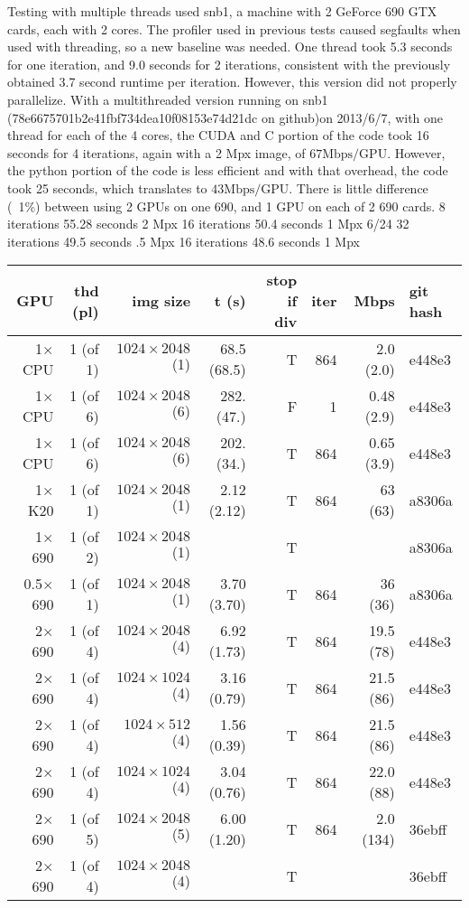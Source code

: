 \documentclass[11pt]{article}
\begin{document}
	Testing with multiple threads used snb1, a machine with 2 GeForce 690 GTX cards, each with 2 cores. The profiler used in previous tests caused segfaults when used with threading, so a new baseline was needed.  One thread took 5.3 seconds for one iteration, and 9.0 seconds for 2 iterations, consistent with the previously obtained 3.7 second runtime per iteration.  However, this version did not properly parallelize.
	With a multithreaded version running on snb1 (78e6675701b2e41fbf734dea10f08153e74d21dc on github)on 2013/6/7, with one thread for each of the 4 cores, the CUDA and C portion of the code took 16 seconds for 4 iterations, again with a 2 Mpx image, of $67 \mathrm{Mbps/GPU}$.  However, the python portion of the code is less efficient and with that overhead, the code took 25 seconds, which translates to $43 \mathrm{Mbps/GPU}$.  There is little difference (~1\%) between using 2 GPUs on one 690, and 1 GPU on each of 2 690 cards.
	8 iterations 55.28 seconds 2 Mpx
	16 iterations 50.4 seconds 1 Mpx
	6/24
	32 iterations 49.5 seconds .5 Mpx
	16 iterations 48.6 seconds 1 Mpx
	
	\begin{tabular}{r|r|r|r|r|r|r|l}
	GPU & thd (pl) & img size & t (s) & stop if div & iter & Mbps & git hash \\
	\hline
	1$\times$CPU & 1 (of 1) & $1024 \times 2048$ (1)& 68.5 (68.5) & T & 864 &  2.0 (2.0) & e448e3\\
	1$\times$CPU & 1 (of 6) & $1024 \times 2048$ (6)& 282. (47.)  & F &   1 & 0.48 (2.9) & e448e3\\
	1$\times$CPU & 1 (of 6) & $1024 \times 2048$ (6)& 202. (34.)  & T & 864 & 0.65 (3.9) & e448e3\\
	1$\times$K20 & 1 (of 1) & $1024 \times 2048$ (1)& 2.12 (2.12) & T & 864 &    63 (63) & a8306a\\
	1$\times$690 & 1 (of 2) & $1024 \times 2048$ (1)&             & T &     &            & a8306a\\
  0.5$\times$690 & 1 (of 1) & $1024 \times 2048$ (1)& 3.70 (3.70) & T & 864 &    36 (36) & a8306a\\
	2$\times$690 & 1 (of 4) & $1024 \times 2048$ (4)& 6.92 (1.73) & T & 864 &  19.5 (78) & e448e3\\
	2$\times$690 & 1 (of 4) & $1024 \times 1024$ (4)& 3.16 (0.79) & T & 864 &  21.5 (86) & e448e3\\
	2$\times$690 & 1 (of 4) & $1024 \times  512$ (4)& 1.56 (0.39) & T & 864 &  21.5 (86) & e448e3\\
	2$\times$690 & 1 (of 4) & $1024 \times 1024$ (4)& 3.04 (0.76) & T & 864 &  22.0 (88) & e448e3\\
	2$\times$690 & 1 (of 5) & $1024 \times 2048$ (5)& 6.00 (1.20) & T & 864 &  2.0 (134) & 36ebff\\
	2$\times$690 & 1 (of 4) & $1024 \times 2048$ (4)&             & T &     &            & 36ebff
	\end{tabular}
\end{document}
